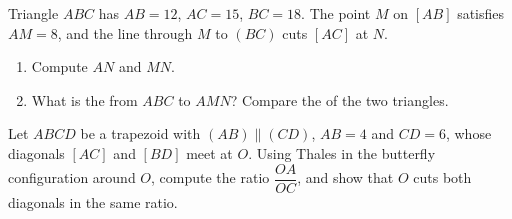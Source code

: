 \begin{exercise}[$\star\star$]\label{exo:g9:thales:8}
Triangle $ABC$ has $AB = 12$, $AC = 15$, $BC = 18$. The point $M$ on
$[AB]$ satisfies $AM = 8$, and the line through $M$  to $(BC)$
cuts $[AC]$ at $N$.
\begin{enumerate}
  \item Compute $AN$ and $MN$.
  \item What is the  from $ABC$ to $AMN$? Compare the
         of the two triangles.
\end{enumerate}
\end{exercise}

\begin{exercise}[$\star\star\star$]\label{exo:g9:thales:9}
Let $ABCD$ be a trapezoid with $(AB) \parallel (CD)$, $AB = 4$ and
$CD = 6$, whose diagonals $[AC]$ and $[BD]$ meet at $O$.
Using Thales in the butterfly configuration around $O$, compute the
ratio $\dfrac{OA}{OC}$, and show that $O$ cuts both diagonals in the
same ratio.
\end{exercise}
